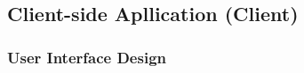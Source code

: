 \subsection{Client-side Apllication (Client)}
\label{sec:client}


\subsubsection{User Interface Design}

\subsubsection{}




%
%
%
%
%
%
%
%
%
%
%
%
%
%
%
